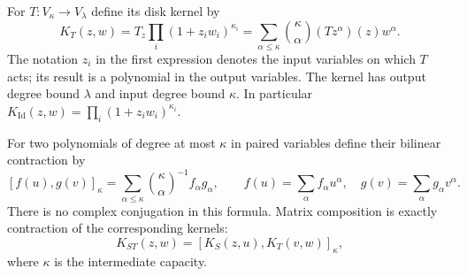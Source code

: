 \documentclass[reqno]{amsart}
\theoremstyle{definition}
\theoremstyle{remark}
\DeclareMathOperator{\Id}{Id}
\begin{document}
For $T:V_\kappa\to V_\lambda$ define its disk kernel by
\begin{equation}\label{pre:kernel}
 K_T(z,w)=T_z\prod_i(1+z_iw_i)^{\kappa_i}
 =\sum_{\alpha\leq\kappa}\binom{\kappa}{\alpha}
       (Tz^\alpha)(z)w^\alpha.
\end{equation}
The notation $z_i$ in the first expression denotes the input variables
on which $T$ acts; its result is a polynomial in the output variables.
The kernel has output degree bound $\lambda$ and input degree bound
$\kappa$. In particular $K_{\Id}(z,w)=\prod_i(1+z_iw_i)^{\kappa_i}$.

For two polynomials of degree at most $\kappa$ in paired variables define
their bilinear contraction by
\begin{equation}\label{pre:contraction}
 [f(u),g(v)]_\kappa
   =\sum_{\alpha\leq\kappa}
      \binom{\kappa}{\alpha}^{-1} f_\alpha g_\alpha,
 \qquad
 f(u)=\sum_\alpha f_\alpha u^\alpha,\quad
 g(v)=\sum_\alpha g_\alpha v^\alpha .
\end{equation}
There is no complex conjugation in this formula. Matrix composition is
exactly contraction of the corresponding kernels:
\[
 K_{ST}(z,w)=[K_S(z,u),K_T(v,w)]_\kappa,
\]
where $\kappa$ is the intermediate capacity.
\end{document}

